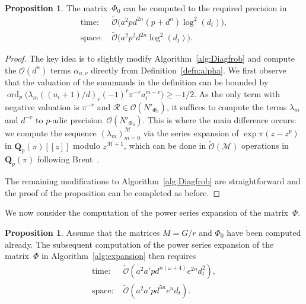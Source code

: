 \documentclass[a4paper,11pt]{article}
\numberwithin{equation}{section}
\newcommand{\QQ}{\mathbf{Q}} %
\DeclareMathOperator{\ord}{ord}          %
\providecommand{\BigOh}{\mathcal{O}}          %
\providecommand{\SoftOh}{\tilde{\mathcal{O}}} %
\theoremstyle{definition}
\newtheorem{prop}[thm]{Proposition}
\begin{document}
\begin{prop} \label{prop:compPhi0}
The matrix~$\Phi_0$ can be computed to the required precision in 
\begin{align*}
\mbox{time: }  &\SoftOh\bigl(a^2 p d^{2n} (p + d^n) \log^2(d_t) \bigr), \\
\mbox{space: } &\SoftOh\bigl(a^2 p^2 d^{2n} \log^2(d_t)\bigr).
\end{align*}
\end{prop}

\begin{proof}
The key idea is to slightly modify Algorithm~\ref{alg:Diagfrob} 
and compute the $\BigOh(d^n)$ terms $\alpha_{u,v}$ directly from 
Definition~\ref{defn:alpha}.  We first observe that the valuation 
of the summands in the definition can be bounded by 
$\ord_p\bigl(\lambda_m ((u_i+1)/d)_r (-1)^r \pi^{-r} a_i^{m-r}\bigr) \geq -1/2$. 
As the only term with negative valuation is $\pi^{-r}$ and 
$\mathcal{R} \in \BigOh(N'_{\Phi_0})$, it suffices 
to compute the terms $\lambda_m$ and $d^{-r}$ to $p$-adic 
precision~$\BigOh(N'_{\Phi_0})$.  This is where the main 
difference occurs:  we compute the sequence 
$(\lambda_m)_{m=0}^{\mathcal{M}}$ via the series expansion of 
$\exp \pi (z - z^p)$ in $\QQ_p(\pi)[[z]]$ modulo $z^{\mathcal{M}+1}$, 
which can be done in $\SoftOh(\mathcal{M})$ operations in $\QQ_p(\pi)$ 
following Brent~\citep{Brent1976}.

The remaining modifications to Algorithm~\ref{alg:Diagfrob} are 
straightforward and the proof of the proposition can be completed 
as before.
\end{proof}

We now consider the computation of the power series expansion of the 
matrix~$\Phi$.

\begin{prop}
Assume that the matrices $M = G/r$ and $\Phi_0$ have been computed already.
The subsequent computation of the power series expansion of the matrix~$\Phi$ 
in Algorithm~\ref{alg:expansion} then requires
\begin{align*}
\mbox{time: }  &\SoftOh(a^2 a' p d^{n(\omega+4)}e^{2n} d_t^2), \\
\mbox{space: } &\SoftOh(a^2 a' p d^{5n} e^n d_t).
\end{align*}
\end{prop}
\end{document}
